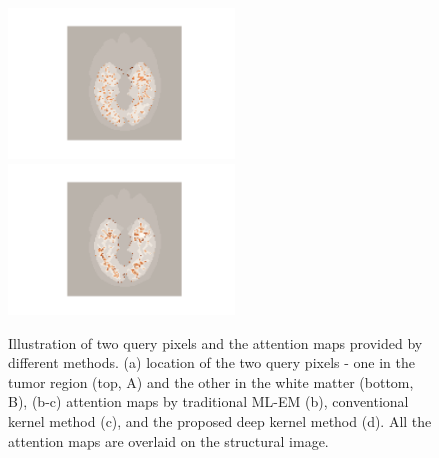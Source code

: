 \documentclass[]{IEEETran}
\begin{document}
\begin{figure}[t]
{\begin{minipage}[t]{0.22\linewidth}
				\centering
				\includegraphics[trim=3.4cm 1cm 3.4cm 0.5cm, clip, height=4cm]{K_tumor.png}\\
				\includegraphics[trim=3.4cm 1cm 3.4cm 0.5cm, clip, height=4cm]{K_white.png}
			\end{minipage}%
		}
		\caption{Illustration of two query pixels and the attention maps provided by different methods. (a) location of the two query pixels - one in the tumor region (top, A) and the other in the white matter (bottom, B),  (b-c) attention maps by traditional ML-EM (b), conventional kernel method (c), and the proposed deep kernel method (d). All the attention maps are overlaid on the structural image.}
		\label{fig:attention}
	\end{figure}
\end{document}
